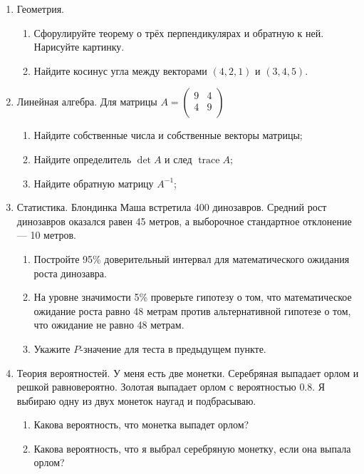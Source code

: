 \documentclass[12pt]{article}
\DeclareMathOperator{\tr}{trace}
\begin{document}
\newpage
\begin{enumerate}

  \item Геометрия.
  \begin{enumerate}
    \item Сфорулируйте теорему о трёх перпендикулярах и обратную к ней. Нарисуйте картинку.
    \item Найдите косинус угла между векторами $(4, 2, 1)$ и $(3, 4, 5)$.
  \end{enumerate}
  

  \item Линейная алгебра. Для матрицы
$
  A=\begin{pmatrix}
  9 & 4  \\
  4 & 9  \\
  \end{pmatrix}
$

  \begin{enumerate}
  \item Найдите собственные числа и собственные векторы матрицы;
  \item Найдите определитель $\det A$ и след $\tr A$;
 \item Найдите обратную матрицу $A^{-1}$;
  \end{enumerate}


  \item Статистика. Блондинка Маша встретила 400 динозавров.
  Средний рост динозавров оказался равен 45 метров, а выборочное стандартное отклонение — 10 метров.

  \begin{enumerate}
    \item Постройте 95\% доверительный интервал для математического ожидания роста динозавра.
    \item На уровне значимости 5\% проверьте гипотезу о том, что математическое ожидание
    роста равно 48 метрам против альтернативной гипотезе о том, что ожидание не равно 48 метрам.
    \item Укажите $P$-значение для теста в предыдущем пункте.
  \end{enumerate}

 \item Теория вероятностей. У меня есть две монетки. Серебряная выпадает орлом и решкой равновероятно.
 Золотая выпадает орлом с вероятностью $0.8$. 
 Я выбираю одну из двух монеток наугад и подбрасываю.
 \begin{enumerate}
   \item Какова вероятность, что монетка выпадет орлом?
   \item Какова вероятность, что я выбрал серебряную монетку, если она выпала орлом?
 \end{enumerate}

\end{enumerate}
\end{document}
